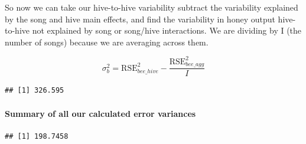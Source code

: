 \documentclass[
  openany]{book}
\newenvironment{Shaded}{\begin{snugshade}}{\end{snugshade}}
\newcommand{\CommentTok}[1]{\textcolor[rgb]{0.56,0.35,0.01}{\textit{#1}}}
\newcommand{\DecValTok}[1]{\textcolor[rgb]{0.00,0.00,0.81}{#1}}
\newcommand{\FunctionTok}[1]{\textcolor[rgb]{0.00,0.00,0.00}{#1}}
\newcommand{\NormalTok}[1]{#1}
\newcommand{\OtherTok}[1]{\textcolor[rgb]{0.56,0.35,0.01}{#1}}
\newcommand{\SpecialCharTok}[1]{\textcolor[rgb]{0.00,0.00,0.00}{#1}}
\begin{document}
So now we can take our hive-to-hive variability subtract the variability explained by the song and hive main effects, and find the variability in honey output hive-to-hive not explained by song or song/hive interactions. We are dividing by I (the number of songs) because we are averaging across them.

\[ \sigma_b^2 = \text{RSE}_{bee\_hive}^2 - \frac{\text{RSE}_{bee\_agg}^2}{I}\]

\begin{Shaded}
\end{Shaded}

\begin{verbatim}
## [1] 326.595
\end{verbatim}

\hypertarget{summary-of-all-our-calculated-error-variances}{%
\paragraph{Summary of all our calculated error variances}\label{summary-of-all-our-calculated-error-variances}}

\begin{Shaded}
\end{Shaded}

\begin{verbatim}
## [1] 198.7458
\end{verbatim}

\begin{Shaded}
\end{Shaded}
\end{document}
